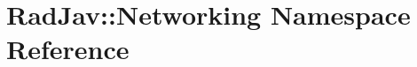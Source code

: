 \hypertarget{namespace_rad_jav_1_1_networking}{}\section{Rad\+Jav\+:\+:Networking Namespace Reference}
\label{namespace_rad_jav_1_1_networking}
